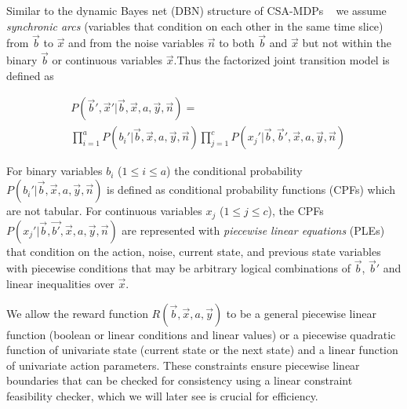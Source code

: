  
Similar to the dynamic Bayes net (DBN) structure of CSA-MDPs ~\cite{sdp_aaai} 
we assume \emph{synchronic arcs} (variables that condition on each
other in the same time slice) from $\vec{b}$ to $\vec{x}$ and from the noise variables $\vec{n}$ to both $\vec{b}$ and $\vec{x}$ but not within the binary $\vec{b}$ or continuous variables $\vec{x}$.Thus the factorized joint transition model is defined as

{\footnotesize
\begin{align}
& P(\vec{b}',\vec{x}'|\vec{b},\vec{x}, a,\vec{y},\vec{n}) = \nonumber  \\
& %
\prod_{i=1}^a P(b_i'|\vec{b},\vec{x} ,a,\vec{y},\vec{n}) 
\prod_{j=1}^c P(x_j'|\vec{b},\vec{b}',\vec{x},a,\vec{y},\vec{n})
\end{align}
}

For binary variables $b_i$ ($1 \leq i \leq a$) the conditional probability $P(b_i'|\vec{b},\vec{x},a,\vec{y},\vec{n})$ is defined as 
conditional probability functions (CPFs) which are not tabular.  For continuous variables $x_j$ ($1 \leq j \leq c$), the CPFs $P(x_j'|\vec{b},\vec{b'},\vec{x},a,\vec{y},\vec{n})$ are represented with \emph{piecewise linear equations} (PLEs) that condition on the action, noise, current state, and previous state variables with piecewise conditions that may be arbitrary logical combinations of $\vec{b}$, $\vec{b}'$  and linear inequalities over $\vec{x}$. 

We allow the reward function $R(\vec{b},\vec{x},a,\vec{y})$ to be a general piecewise linear function (boolean or linear conditions
and linear values) or a piecewise quadratic function of univariate state (current state or the next state) and a linear function of univariate action parameters. These constraints ensure piecewise linear boundaries that can be checked for consistency using a linear constraint feasibility checker, which we will later see is crucial for efficiency.

